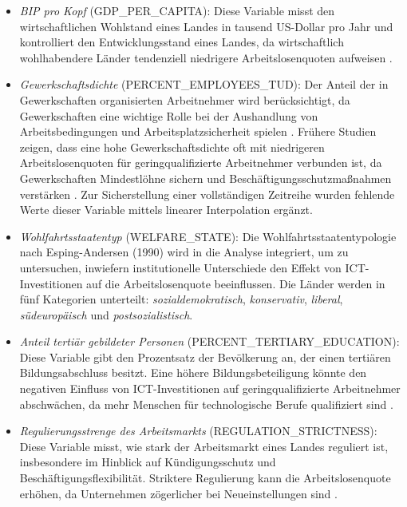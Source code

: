 \begin{itemize}
    \item \textit{\ac{BIP} pro Kopf} (GDP\_PER\_CAPITA): Diese Variable misst den wirtschaftlichen 
    Wohlstand eines Landes in tausend US-Dollar pro Jahr und kontrolliert den Entwicklungsstand 
    eines Landes, da wirtschaftlich wohlhabendere Länder tendenziell niedrigere Arbeitslosenquoten 
    aufweisen \parencite{oecd2022gdp}.
    \item \textit{Gewerkschaftsdichte} (PERCENT\_EMPLOYEES\_TUD): Der Anteil der in Gewerkschaften 
    organisierten Arbeitnehmer wird berücksichtigt, da Gewerkschaften eine wichtige Rolle bei der 
    Aushandlung von Arbeitsbedingungen und Arbeitsplatzsicherheit spielen \parencite{oecd2022tud}. 
    Frühere Studien zeigen, dass eine hohe Gewerkschaftsdichte oft mit niedrigeren 
    Arbeitslosenquoten für geringqualifizierte Arbeitnehmer verbunden ist, da Gewerkschaften 
    Mindestlöhne sichern und Beschäftigungsschutzmaßnahmen verstärken 
    \parencite[S. 61]{nickell1997unemployment}. Zur Sicherstellung einer vollständigen Zeitreihe 
    wurden fehlende Werte dieser Variable mittels linearer Interpolation ergänzt.
    \item \textit{Wohlfahrtsstaatentyp} (WELFARE\_STATE): Die Wohlfahrtsstaatentypologie nach 
    Esping-Andersen (1990) \parencite{espingandersen1990thethree} wird in die Analyse integriert, 
    um zu untersuchen, inwiefern institutionelle Unterschiede den Effekt von \ac{ICT}-Investitionen 
    auf die Arbeitslosenquote beeinflussen. Die Länder werden in fünf Kategorien unterteilt: 
    \textit{sozialdemokratisch}, \textit{konservativ}, \textit{liberal}, \textit{südeuropäisch} 
    und \textit{postsozialistisch}.
    \item \textit{Anteil tertiär gebildeter Personen} (PERCENT\_TERTIARY\_EDUCATION): Diese 
    Variable gibt den Prozentsatz der Bevölkerung an, der einen tertiären Bildungsabschluss 
    besitzt. Eine höhere Bildungsbeteiligung könnte den negativen Einfluss von 
    \ac{ICT}-Investitionen auf geringqualifizierte Arbeitnehmer abschwächen, da mehr Menschen für 
    technologische Berufe qualifiziert sind \parencite{oecd2022education}.
    \item \textit{Regulierungsstrenge des Arbeitsmarkts} (REGULATION\_STRICTNESS): Diese Variable 
    misst, wie stark der Arbeitsmarkt eines Landes reguliert ist, insbesondere im Hinblick auf 
    Kündigungsschutz und Beschäftigungsflexibilität. Striktere Regulierung kann die 
    Arbeitslosenquote erhöhen, da Unternehmen zögerlicher bei Neueinstellungen sind 
    \parencite{oecd2022regulation}.
\end{itemize}

